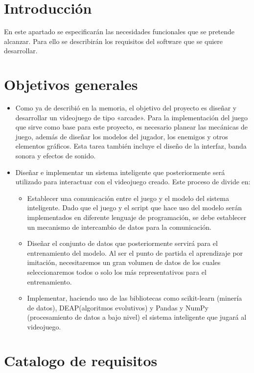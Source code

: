 
\section{Introducción}
En este apartado se especificarán las necesidades funcionales que se pretende alcanzar. Para ello se describirán los requisitos del software que se quiere desarrollar.

\section{Objetivos generales}
\begin{itemize}
    \item Como ya de describió en la memoria, el objetivo del proyecto es diseñar y desarrollar un videojuego de tipo «arcade». Para la implementación del juego que sirve como base para este proyecto, es necesario planear las mecánicas de juego, además de diseñar los modelos del jugador, los enemigos y otros elementos gráficos. Esta tarea también incluye el diseño de la interfaz, banda sonora y efectos de sonido. 
    
    \item Diseñar e implementar un sistema inteligente que posteriormente será utilizado para interactuar con el videojuego creado. Este proceso de divide en:
    \begin{itemize}
        \item Establecer una comunicación entre el juego y el modelo del sistema inteligente. Dado que el juego y el script que hace uso del modelo serán implementados en diferente lenguaje de programación, se debe establecer un mecanismo de intercambio de datos para la comunicación.
        \item Diseñar el conjunto de datos que posteriormente servirá para el entrenamiento del modelo. Al ser el punto de partida el aprendizaje por imitación, necesitaremos un gran volumen de datos de los cuales seleccionaremos todos o solo los más representativos para el entrenamiento.
        \item Implementar, haciendo uso de las bibliotecas como scikit-learn (minería de datos), DEAP(algoritmos evolutivos) y Pandas y NumPy (procesamiento de datos a bajo nivel) el sistema inteligente que jugará al videojuego.
    \end{itemize}
\end{itemize}

\section{Catalogo de requisitos}

